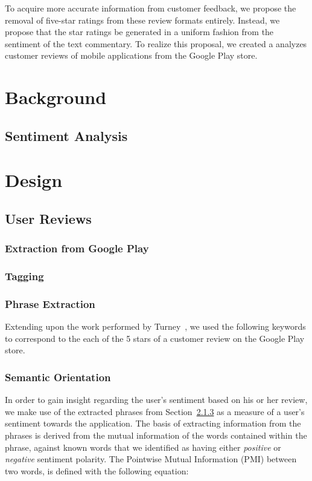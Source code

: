 \documentclass[11pt]{report} %
\begin{document}
To acquire more accurate information from customer feedback, we propose the removal of five-star ratings from these review formats entirely. Instead, we propose that the star ratings be generated in a uniform fashion from the sentiment of the text commentary. To  realize this proposal, we created a analyzes customer reviews of mobile applications from the Google Play store.

\chapter{Background}
	\section{Sentiment Analysis}

\chapter{Design}
\section{User Reviews}
\subsection{Extraction from Google Play}
\subsection{Tagging}
\subsection{Phrase Extraction}
\label{subsection:phrase_extraction}
Extending upon the work performed by Turney~\cite{Turney2001}, we used the following keywords to correspond to the each of the 5 stars 
of a customer review on the Google Play store. 
\subsection{Semantic Orientation}

In order to gain insight regarding the user's sentiment based on his or her review, we make use of the extracted phrases from 
Section~\ref{subsection:phrase_extraction} as a measure of a user's sentiment towards the application. The basis of extracting information from the phrases is derived from the mutual information of the words contained within the phrase, against known words that we identified as having either \textit{positive} or \textit{negative} sentiment polarity. The Pointwise Mutual Information (PMI) between two words\cite{church1990}, is defined with the following equation:
\end{document}

